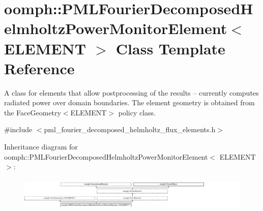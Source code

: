 \hypertarget{classoomph_1_1PMLFourierDecomposedHelmholtzPowerMonitorElement}{}\section{oomph\+:\+:P\+M\+L\+Fourier\+Decomposed\+Helmholtz\+Power\+Monitor\+Element$<$ E\+L\+E\+M\+E\+NT $>$ Class Template Reference}
\label{classoomph_1_1PMLFourierDecomposedHelmholtzPowerMonitorElement}


A class for elements that allow postprocessing of the results -- currently computes radiated power over domain boundaries. The element geometry is obtained from the Face\+Geometry$<$\+E\+L\+E\+M\+E\+N\+T$>$ policy class.  




{\ttfamily \#include $<$pml\+\_\+fourier\+\_\+decomposed\+\_\+helmholtz\+\_\+flux\+\_\+elements.\+h$>$}

Inheritance diagram for oomph\+:\+:P\+M\+L\+Fourier\+Decomposed\+Helmholtz\+Power\+Monitor\+Element$<$ E\+L\+E\+M\+E\+NT $>$\+:\begin{figure}[H]
\begin{center}
\leavevmode
\includegraphics[height=1.612671cm]{classoomph_1_1PMLFourierDecomposedHelmholtzPowerMonitorElement}
\end{center}
\end{figure}
